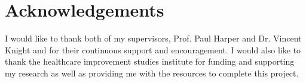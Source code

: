 \section*{Acknowledgements}

I would like to thank both of my supervisors, Prof. Paul Harper and Dr. Vincent 
Knight and for their continuous support and encouragement. 
I would also like to thank the healthcare improvement studies institute for
funding and supporting my research as well as  providing me with the resources 
to complete this project.
